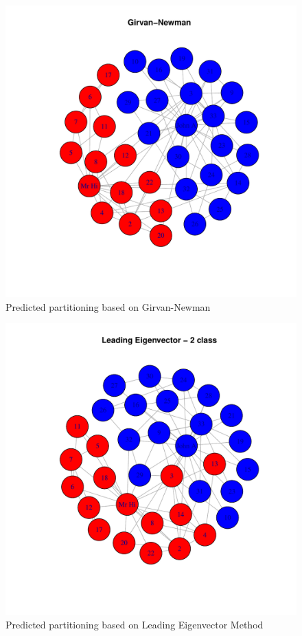 \begin{figure}[H]
\centering 
\includegraphics[width=.8\textwidth]{../Rplots1.pdf}
\caption{Predicted partitioning based on Girvan-Newman}
\end{figure}

\begin{figure}[H]
\centering 
\includegraphics[width=.8\textwidth]{../Rplots2.pdf}
\caption{Predicted partitioning based on Leading Eigenvector Method}
\end{figure}


%
%
%






